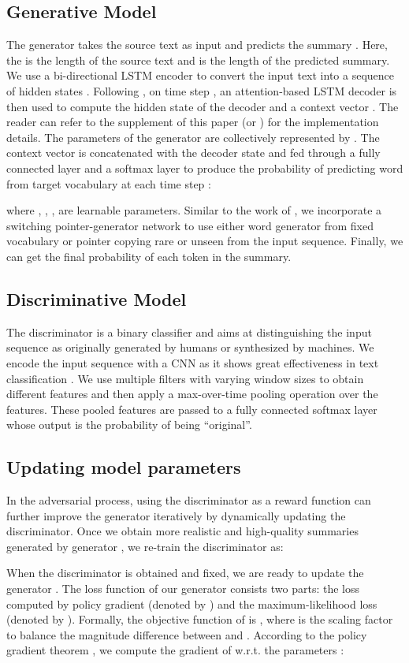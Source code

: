 \documentclass[letterpaper]{article} \usepackage{aaai18}  \usepackage{times}  \usepackage{helvet}  \usepackage{courier}  \usepackage{url}  \usepackage{graphicx}  \frenchspacing  \usepackage{multirow}
\begin{document}
\subsection{Generative Model}
The generator takes the source text  as input and predicts the summary . Here, the  is the length of the source text  and  is the length of the predicted summary. We use a bi-directional LSTM encoder to convert the input text  into a sequence of hidden states .  Following \cite{see2017get}, on time step , an attention-based LSTM decoder is then used to compute the hidden state  of the decoder and a context vector .  The reader can refer to the supplement of this paper (or  \cite{see2017get}) for the implementation details. The parameters of the generator  are collectively represented by .  The context vector  is concatenated with the decoder state  and fed through a fully connected layer and a softmax layer to produce the  probability of predicting word from target vocabulary at each time step :
{\footnotesize

	
    
}
where ,  , ,  are learnable parameters.  Similar to the work of \cite{see2017get}, we incorporate a switching pointer-generator network to use either word generator from fixed vocabulary or pointer copying rare or unseen from the input sequence. Finally, we can get the final probability  of each token  in the summary. 

\subsection{Discriminative Model}

The discriminator is a binary classifier and aims at distinguishing the input sequence as originally generated by humans or synthesized by machines. We encode the input sequence with a CNN as it shows great effectiveness in text classification \cite{kim2014convolutional}. We use multiple filters with varying window sizes to obtain different features and then apply a max-over-time pooling operation over the features. These pooled features are passed to a fully connected softmax layer whose output is the probability of being “original”. 

\subsection{Updating model parameters}
In the adversarial process, using the discriminator as a reward function can further improve the generator iteratively by dynamically updating the discriminator. Once we obtain more realistic and high-quality summaries generated by generator , we re-train the discriminator as:  
{\scriptsize
	
}
When the discriminator  is obtained and fixed, we are ready to update the generator . The loss function of our generator  consists two parts: the loss computed by policy gradient (denoted by ) and the maximum-likelihood loss (denoted by ). 
Formally, the objective function of  is , where  is the scaling factor to balance the magnitude difference between  and .  According to the policy gradient theorem \cite{sutton2000policy},  we compute the gradient of   w.r.t. the parameters :
\end{document}
